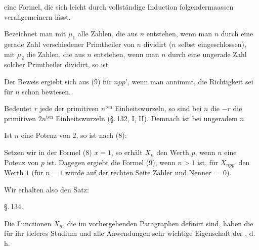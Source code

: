 eine Formel, die sich leicht durch vollständige Induction folgendermaassen
verallgemeinern lässt.

Bezeichnet man mit $\mu_1$ alle Zahlen, die aus $n$ entstehen, wenn man $n$
durch eine gerade Zahl verschiedener Primtheiler von $n$ dividirt ($n$ selbst
eingeschlossen), mit $\mu_2$ die Zahlen, die aus $n$ entstehen, wenn man $n$
durch eine ungerade Zahl solcher Primtheiler dividirt, so ist


Der Beweis ergiebt sich aus (9) für $npp'$, wenn man annimmt, die Richtigkeit
sei für $n$ schon bewiesen.

Bedeutet $r$ jede der primitiven $n^{\mathrm{ten}}$ Einheitswurzeln, so sind
bei  $n$ die $-r$ die primitiven $2n^{\mathrm{ten}}$ Einheitswurzeln
(\S.\,132, I, II). Demnach ist bei ungeradem $n$


Ist $n$ eine Potenz von $2$, so ist nach (8):


Setzen wir in der Formel (8) $x = 1$, so erhält $X_n$ den Werth $p$, wenn $n$
eine Potenz von $p$ ist. Dagegen ergiebt die Formel (9), wenn $n > 1$ ist, für
$X_{npp'}$ den Werth $1$ (für $n = 1$ würde auf der rechten Seite Zähler und
Nenner $= 0$).

Wir erhalten also den Satz:


\begin{center}
\S.\,134.

\end{center}

Die Functionen $X_n$, die im vorhergehenden Paragraphen definirt sind, haben
die für ihr tieferes Studium und alle Anwendungen sehr wichtige Eigenschaft
der , d. h.

